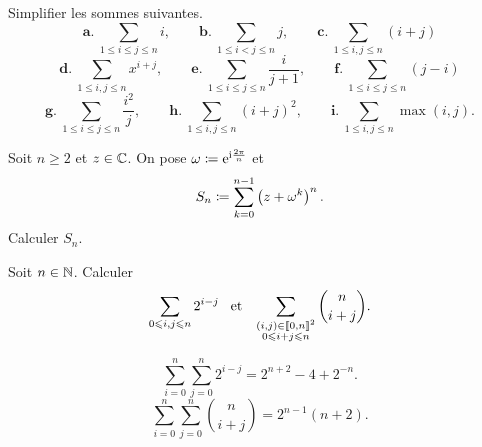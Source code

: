 \documentclass{magnolia}
\begin{document}

Simplifier les sommes suivantes.
\[\textbf{a.}\ \sum_{1\leq i\leq j\leq n} i, \qquad
  \textbf{b.}\ \sum_{1\leq i < j\leq n} j, \qquad
  \textbf{c.}\ \sum_{1\leq i,j\leq n} (i+j)\]
\[\textbf{d.}\ \sum_{1\leq i,j\leq n} x^{i+j},\qquad
  \textbf{e.}\ \sum_{1\leq i\leq j\leq n} \frac{i}{j+1},\qquad
  \textbf{f.}\ \sum_{1\leq i\leq j\leq n} (j-i)\]
\[\textbf{g.}\ \sum_{1\leq i\leq j\leq n} \frac{i^2}{j},\qquad
  \textbf{h.}\ \sum_{1\leq i,j\leq n} (i+j)^2, \qquad
  \textbf{i.}\ \sum_{1\leq i,j\leq n} \max(i,j).\]




Soit $n\geq 2$ et $z\in\mathbb{C}$. On pose $\omega\coloneqq {\rm e}^{{\rm i}\frac{2\pi}{n}}$ et
\[S_n\coloneqq \sum_{k=0}^{n-1} \left(z+\omega^k\right)^n.\]
Calculer $S_n$.


Soit $n\in\mathbb{N}$. Calculer
\[\sum_{0 \leqslant i,j \leqslant n} 2^{i-j} \quad\!\text{et}\quad\! \sum_{\substack{(i,j)\in\left\llbracket 0,n\right\rrbracket^2\\0\leqslant i+j \leqslant n}} \binom{n}{i+j}.\]
\begin{sol}
\begin{questions}
\question
\[\sum_{i=0}^n \sum_{j=0}^n 2^{i-j}=2^{n+2}-4+2^{-n}.\]
\question
\[\sum_{i=0}^n \sum_{j=0}^n \binom{n}{i+j}=2^{n-1}(n+2).\]
\end{questions}
\end{sol}
\end{document}
